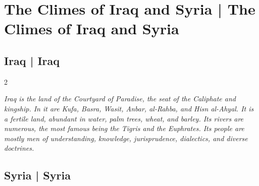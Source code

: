 \documentclass[11pt,a4paper]{article}
\begin{document}
\section{The Climes of Iraq and Syria | The Climes of Iraq and Syria}

\subsection{Iraq | Iraq}

\begin{paracol}{2}

\switchcolumn[0]
\begin{flushright}
{\small\arabicfont
{}}
\end{flushright}

\switchcolumn[1]
\begin{flushleft}
\small
\textit{Iraq is the land of the Courtyard of Paradise, the seat of the Caliphate and kingship. In it are Kufa, Basra, Wasit, Anbar, al-Rahba, and Hisn al-Ahyal. It is a fertile land, abundant in water, palm trees, wheat, and barley. Its rivers are numerous, the most famous being the Tigris and the Euphrates. Its people are mostly men of understanding, knowledge, jurisprudence, dialectics, and diverse doctrines.}
\end{flushleft}

\end{paracol}

\vspace{0.3cm}

\subsection{Syria | Syria}
\end{document}
